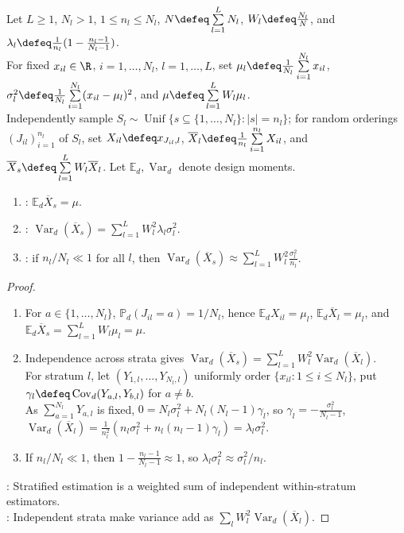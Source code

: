 \begin{theorem} \label{thm:stratified-mean-unbiased-variance} \\
Let $L\geq1$, $N_l>1$, $1\leq n_l\leq N_l$, $N\defeq\sum\limits_{l=1}^{L}N_l$, $W_l\defeq\frac{N_l}{N}$, and $\lambda_l\defeq\frac1{n_l}(1-\frac{n_l-1}{N_l-1})$.\\
For fixed $x_{il}\in\R$, $i=1,\ldots,N_l$, $l=1,\ldots,L$, set $\mu_l\defeq\frac1{N_l}\sum\limits_{i=1}^{N_l}x_{il}$, $\sigma_l^2\defeq\frac1{N_l}\sum\limits_{i=1}^{N_l}(x_{il}-\mu_l)^2$, and $\mu\defeq\sum\limits_{l=1}^{L}W_l\mu_l$.\\
Independently sample $S_l\sim\operatorname{Unif}\{s\subseteq\{1,\ldots,N_l\}:|s|=n_l\}$; for random orderings $(J_{il})_{i=1}^{n_l}$ of $S_l$, set $X_{il}\defeq x_{J_{il},l}$, $\overline{X}_l\defeq\frac1{n_l}\sum\limits_{i=1}^{n_l}X_{il}$, and $\overline{X}_s\defeq\sum\limits_{l=1}^{L}W_l\overline{X}_l$. Let $\mathbb{E}_d,\operatorname{Var}_d$ denote design moments.
\begin{enumerate}[label=(\roman*)]
\setlength{\itemsep}{0pt}
\item {}: $\mathbb{E}_d\overline{X}_s=\mu$.
\item {}: $\operatorname{Var}_d(\overline{X}_s)=\sum\limits_{l=1}^{L}W_l^2\lambda_l\sigma_l^2$.
\item {}: if $n_l/N_l\ll1$ for all $l$, then $\operatorname{Var}_d(\overline{X}_s)\approx\sum\limits_{l=1}^{L}W_l^2\frac{\sigma_l^2}{n_l}$.
\end{enumerate}
\begin{proof}
\begin{enumerate}[label=(\roman*)]
\setlength{\itemsep}{0pt}
\item For $a\in\{1,\ldots,N_l\}$, $\mathbb{P}_d(J_{il}=a)=1/N_l$, hence $\mathbb{E}_dX_{il}=\mu_l$, $\mathbb{E}_d\overline{X}_l=\mu_l$, and $\mathbb{E}_d\overline{X}_s=\sum\limits_{l=1}^{L}W_l\mu_l=\mu$.
\item Independence across strata gives $\operatorname{Var}_d(\overline{X}_s)=\sum\limits_{l=1}^{L}W_l^2\operatorname{Var}_d(\overline{X}_l)$.\\
For stratum $l$, let $(Y_{1,l},\ldots,Y_{N_l,l})$ uniformly order $\{x_{il}:1\leq i\leq N_l\}$, put $\gamma_l\defeq\operatorname{Cov}_d(Y_{a,l},Y_{b,l})$ for $a\neq b$.\\
As $\sum\limits_{a=1}^{N_l}Y_{a,l}$ is fixed, $0=N_l\sigma_l^2+N_l(N_l-1)\gamma_l$, so $\gamma_l=-\frac{\sigma_l^2}{N_l-1}$, $\operatorname{Var}_d(\overline{X}_l)=\frac1{n_l^2}(n_l\sigma_l^2+n_l(n_l-1)\gamma_l)=\lambda_l\sigma_l^2$.
\item If $n_l/N_l\ll1$, then $1-\frac{n_l-1}{N_l-1}\approx1$, so $\lambda_l\sigma_l^2\approx\sigma_l^2/n_l$.
\end{enumerate}
: Stratified estimation is a weighted sum of independent within-stratum estimators.\\
: Independent strata make variance add as $\sum_l W_l^2\operatorname{Var}_d(\overline{X}_l)$.
\end{proof}
\end{theorem}

